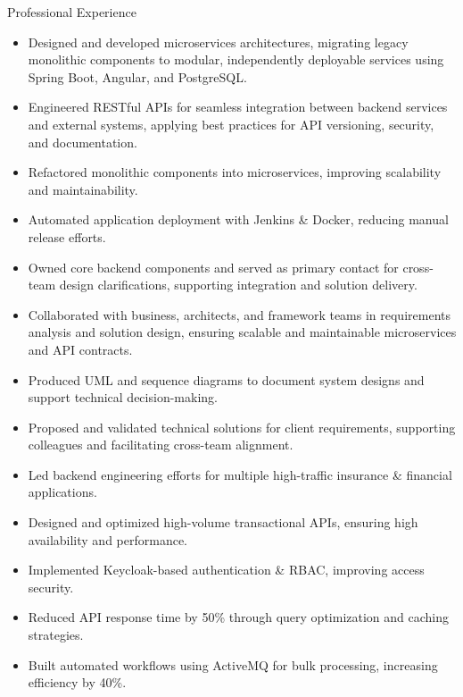 \documentclass{resume}
\begin{document}
\begin{experienceSection}{Professional Experience}
\experienceItem[
company={CBTW},
location={Luxembourg},
position={Java Full-Stack Developer},
duration={Sept 2024 – Jan 2025}
]
\begin{itemize}
\itemsep -6pt {}
\item Designed and developed microservices architectures, migrating legacy monolithic components to modular, independently deployable services using Spring Boot, Angular, and PostgreSQL.
\item Engineered RESTful APIs for seamless integration between backend services and external systems, applying best practices for API versioning, security, and documentation.
\item Refactored monolithic components into microservices, improving scalability and maintainability.
\item Automated application deployment with Jenkins \& Docker, reducing manual release efforts.
\end{itemize}

\experienceItem[
company={VERMEG for Banking and Insurance},
location={Tunis, Tunisia},
duration={Oct 2019 – Aug 2024}
]

\positionItem[
position={Analyst Software Engineer},
duration={Jan 2023 – Aug 2024}
]
\begin{itemize}
\itemsep -6pt {}
\item Owned core backend components and served as primary contact for cross-team design clarifications, supporting integration and solution delivery.
\item Collaborated with business, architects, and framework teams in requirements analysis and solution design, ensuring scalable and maintainable microservices and API contracts.
\item Produced UML and sequence diagrams to document system designs and support technical decision-making.
\item Proposed and validated technical solutions for client requirements, supporting colleagues and facilitating cross-team alignment.
\end{itemize}

\positionItem[
position={Software Engineer},
duration={Oct 2019 – Dec 2022}
]
\begin{itemize}
\itemsep -6pt {}
\item Led backend engineering efforts for multiple high-traffic insurance \& financial applications.
\item Designed and optimized high-volume transactional APIs, ensuring high availability and performance.
\item Implemented Keycloak-based authentication \& RBAC, improving access security.
\item Reduced API response time by 50\% through query optimization and caching strategies.
\item Built automated workflows using ActiveMQ for bulk processing, increasing efficiency by 40\%.
\end{itemize}

\end{experienceSection}
\end{document}
